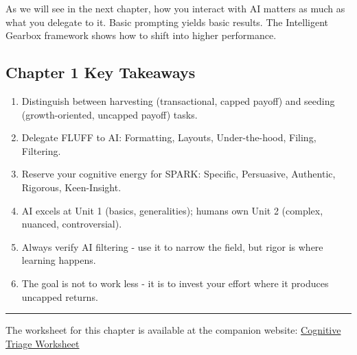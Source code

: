 \documentclass[
  letterpaper,
  DIV=11,
  numbers=noendperiod]{scrreprt}
\providecommand{\tightlist}{%
  \setlength{\itemsep}{0pt}\setlength{\parskip}{0pt}}
\begin{document}
As we will see in the next chapter, how you interact with AI matters as
much as what you delegate to it. Basic prompting yields basic results.
The Intelligent Gearbox framework shows how to shift into higher
performance.

\subsection{Chapter 1 Key Takeaways}\label{chapter-1-key-takeaways}

\begin{enumerate}
\def\labelenumi{\arabic{enumi}.}
\tightlist
\item
  Distinguish between harvesting (transactional, capped payoff) and
  seeding (growth-oriented, uncapped payoff) tasks.
\item
  Delegate FLUFF to AI: Formatting, Layouts, Under-the-hood, Filing,
  Filtering.
\item
  Reserve your cognitive energy for SPARK: Specific, Persuasive,
  Authentic, Rigorous, Keen-Insight.
\item
  AI excels at Unit 1 (basics, generalities); humans own Unit 2
  (complex, nuanced, controversial).
\item
  Always verify AI filtering - use it to narrow the field, but rigor is
  where learning happens.
\item
  The goal is not to work less - it is to invest your effort where it
  produces uncapped returns.
\end{enumerate}

\begin{center}\rule{0.5\linewidth}{0.5pt}\end{center}

\begin{tcolorbox}[enhanced jigsaw, arc=.35mm, bottomrule=.15mm, bottomtitle=1mm, breakable, colback=white, colbacktitle=quarto-callout-note-color!10!white, colframe=quarto-callout-note-color-frame, coltitle=black, left=2mm, leftrule=.75mm, opacityback=0, opacitybacktitle=0.6, rightrule=.15mm, title=\textcolor{quarto-callout-note-color}{\faInfo}\hspace{0.5em}{Companion Worksheet}, titlerule=0mm, toprule=.15mm, toptitle=1mm]

The worksheet for this chapter is available at the companion website:
\href{https://dataii.com/ai/guidebook/\#:~:text=Cognitive\%20Triage\%20Worksheet}{Cognitive
Triage Worksheet}

\end{tcolorbox}
\end{document}
